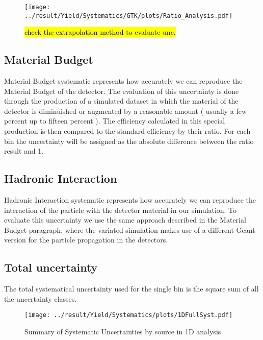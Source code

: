 \begin{figure}
	\centering
		\texttt{[image: ../result/Yield/Systematics/GTK/plots/Ratio\_Analysis.pdf]}
		\caption{\hl{check the extrapolation method to evaluate unc.}}
		\label{}
\end{figure}

\subsection{Material Budget}
Material Budget systematic represents how accurately we can reproduce the Material Budget of the detector. The evaluation of this uncertainty is done through the production of a simulated dataset in which the material of the detector is diminuished or augmented by a reasonable amount ( usually a few percent up to fifteen percent ). The efficiency calculated in this special production is then compared to the standard efficiency by their ratio. For each bin the uncertainty will be assigned as the absolute difference between the ratio result and 1.

\subsection{Hadronic Interaction}
Hadronic Interaction systematic represents how accurately we can reproduce the interaction of the particle with the detector material in our simulation. To evaluate this uncertainty we use the same approach described in the Material Budget paragraph, where the variated simulation makes use of a different Geant version for the particle propagation in the detectors.

\subsection{Total uncertainty}
The total systematical uncertainty used for the single bin is the square sum of all the uncertainty classes.

\newpage
\begin{figure}
	\centering
		\texttt{[image: ../result/Yield/Systematics/plots/1DFullSyst.pdf]}
		\caption{Summary of Systematic Uncertainties by source in 1D analysis}
		\label{fig:FINAL_SYST_1D}
\end{figure}

